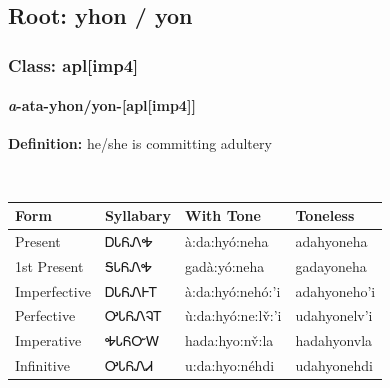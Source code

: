 \needspace{4in}
\subsection*{Root: yhon / yon}
\nopagebreak
{}
\needspace{3in}
\subsubsection*{Class: apl[imp4]}
\nopagebreak
\needspace{2in}
\paragraph*{\textit{a}{-}ata{-}\textbf{yhon/yon}{-}[apl[imp4]]}
\nopagebreak
\textbf{Definition: } he/she is committing adultery
\\[0.5em]
\begin{tabularx}{\textwidth}{l X X X}%
\toprule%
\textbf{Form}&\textbf{Syllabary}&\textbf{With Tone}&\textbf{Toneless}\\%
\midrule%
Present&ᎠᏓᏲᏁᎭ&à:da:hyó:neha&adahyoneha\\%
1st Present&ᎦᏓᏲᏁᎭ&gadà:yó:neha&gadayoneha\\%
Imperfective&ᎠᏓᏲᏁᎰᎢ&à:da:hyó:nehó:’i&adahyoneho’i\\%
Perfective&ᎤᏓᏲᏁᎸᎢ&ù:da:hyó:ne:lv̌:’i&udahyonelv’i\\%
Imperative&ᎭᏓᏲᏅᎳ&hada:hyo:nv̌:la&hadahyonvla\\%
Infinitive&ᎤᏓᏲᏁᏗ&u:da:hyo:néhdi&udahyonehdi\\%
\bottomrule%
\end{tabularx}
\\[1em]